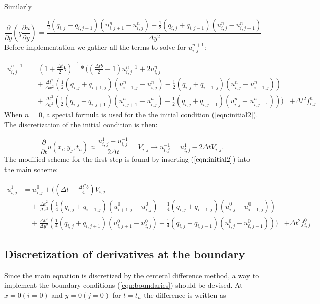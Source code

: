 \documentclass[twoside]{article}
\begin{document}
Similarly

\begin{equation}
\frac{\partial}{\partial y}(q\frac{\partial u}{\partial y})=\frac{\frac{1}{2}(q_{i,j}+q_{i,j+1})(u_{i,j+1}^n-u_{i,j}^n)-\frac{1}{2}(q_{i,j}+q_{i,j-1})(u_{i,j}^n-u_{i,j-1}^n)}{\Delta y^2}
\label{eqn:variabley2}
\end{equation}
Before implementation we gather all the terms to solve for $u_{i,j}^{n+1}$:

\begin{align*}
u_{i,j}^{n+1} &= (1+\frac{\Delta t}{2}b)^{-1}*( (\frac{\Delta t b}{2}-1)u_{i,j}^{n-1}+2 u_{i,j}^n \\
            &\quad +\frac{\Delta t^2}{\Delta x^2} \left( \frac{1}{2}(q_{i,j}+q_{i+1,j})(u_{i+1,j}^n-u_{i,j}^n)-\frac{1}{2}(q_{i,j}+q_{i-1,j})(u_{i,j}^n-u_{i-1,j}^n) \right)\\
            & \quad +\frac{\Delta t^2}{\Delta y^2}\left( \frac{1}{2}(q_{i,j}+q_{i,j+1})(u_{i,j+1}^n-u_{i,j}^n)-\frac{1}{2}(q_{i,j}+q_{i,j-1})(u_{i,j}^n-u_{i,j-1}^n)  \right))
            & +\Delta t^2f_{i,j}^{n}
\end{align*}
When $n=0$, a special formula is used for the the initial condition (\ref{eqn:initial2}). The discretization of the initial condition is then:


\begin{equation}
\frac{\partial}{\partial t}u(x_i,y_j,t_n)\approx \frac{u_{i,j}^1-u_{i,j}^{-1}}{2\Delta t}= V_{i,j}
\rightarrow u_{i,j}^{-1}=u_{i,j}^1-2\Delta t V_{i,j}.
\label{eqn:initialalgor}
\end{equation}
The modified scheme for the first step is found by inserting ($\ref{eqn:initial2}$) into the main scheme:

\begin{align*}
u_{i,j}^{1} &= u_{i,j}^0+((\Delta t-\frac{\Delta t^2 b}{4})V_{i,j} \\
            &\quad +\frac{\Delta t^2}{\Delta x^2} \left( \frac{1}{4}(q_{i,j}+q_{i+1,j})(u_{i+1,j}^0-u_{i,j}^0)-\frac{1}{4}(q_{i,j}+q_{i-1,j})(u_{i,j}^0-u_{i-1,j}^0) \right)\\
            & \quad +\frac{\Delta t^2}{\Delta y^2}\left( \frac{1}{4}(q_{i,j}+q_{i,j+1})(u_{i,j+1}^0-u_{i,j}^0)-\frac{1}{4}(q_{i,j}+q_{i,j-1})(u_{i,j}^0-u_{i,j-1}^0)  \right))
            & +\Delta t^2f_{i,j}^{0}
\end{align*}

\subsection{Discretization of derivatives at the boundary}
\label{boundary2}
Since the main equation is discretized by the centeral difference method, a way to implement the boundary conditions (\ref{eqn:boundaries}) should be devised. At $x=0 (i=0)$ and $y=0 (j=0)$ for $t=t_n$ the difference is written as
\end{document}
